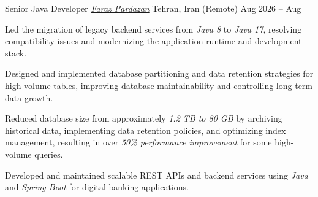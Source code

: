 

\begin{cventries}

  \cventry
    {Senior Java Developer}
    {\href{https://farazpardazan.com}{\textit{Faraz Pardazan}}}
    {Tehran, Iran (Remote)}
    {Aug 2026 -- Aug}
    {
    \begin{cvitems}
      \item Led the migration of legacy backend services from \textit{Java 8} to \textit{Java 17}, resolving compatibility issues and modernizing the application runtime and development stack.
      \item Designed and implemented database partitioning and data retention strategies for high-volume tables, improving database maintainability and controlling long-term data growth.
      \item Reduced database size from approximately \textit{1.2 TB to 80 GB} by archiving historical data, implementing data retention policies, and optimizing index management, resulting in over \textit{50\% performance improvement} for some high-volume queries.
      \item Developed and maintained scalable REST APIs and backend services using \textit{Java} and \textit{Spring Boot} for digital banking applications.
    \end{cvitems}
    }


\end{cventries}
